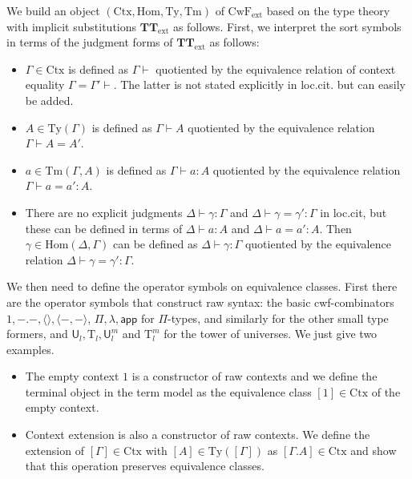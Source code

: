 \documentclass[11pt,a4paper]{article}
\theoremstyle{plain}
\theoremstyle{definition}
\newcommand{\app}[2]{{#1\,#2}} %
\newcommand{\Ctx}{\mathrm{Ctx}}
\newcommand{\Sub}{\mathrm{Hom}}
\newcommand{\Ty}{\mathrm{Ty}}
\newcommand{\Tm}{\mathrm{Tm}}
\newcommand{\tuple}[1]{\langle #1 \rangle}
\def\app{\mathsf{app}}
\def\U{\mathsf{U}}
\newcommand{\Ta}{\mathrm{T}}
\def\CwFext{\mathrm{CwF_{ext}}}
\def\TText{{\mathbf{TT}_\mathrm{ext}}}
\begin{document}
We build an object $(\Ctx,\Sub,\Ty,\Tm)$ of $\CwFext$ based on the type theory with implicit substitutions $\TText$ as follows. First, we interpret the sort symbols in terms of the judgment forms of $\TText$ as follows:
\begin{itemize}
\item $\Gamma \in \Ctx$ is defined as $\Gamma \vdash$ quotiented by the equivalence relation of context equality $\Gamma = \Gamma' \vdash$. The latter is not stated explicitly in loc.cit. but can easily be added.
\item $A \in \Ty(\Gamma)$ is defined as $\Gamma \vdash A$ quotiented by the equivalence relation $\Gamma \vdash A = A'$.
\item $a \in \Tm(\Gamma,A)$ is defined as $\Gamma \vdash a : A$ quotiented by the equivalence relation $\Gamma \vdash a = a' : A$.
\item There are no explicit judgments $\Delta \vdash \gamma : \Gamma$ and $\Delta \vdash \gamma = \gamma' : \Gamma$  in loc.cit, but these can be defined in terms of $\Delta \vdash a : A$ and $\Delta \vdash a = a' : A$. Then $\gamma \in \Sub(\Delta,\Gamma)$ can be defined as $\Delta \vdash \gamma : \Gamma$ quotiented by the equivalence relation $\Delta \vdash  \gamma = \gamma' : \Gamma$.
\end{itemize}
We then need to define the operator symbols on equivalence classes. First there are the operator symbols that construct raw syntax: the basic cwf-combinators $1, -.-, \tuple{}, \tuple{-,-}$,  $\Pi, \lambda, \app$ for $\Pi$-types, and similarly for the other small type formers, and $\U_l, \Ta_l, \U^m_l$ and $\Ta^m_l$ for the tower of universes. We just give two examples.
\begin{itemize}
\item The empty context $1$ is a constructor of raw contexts and we define the terminal object in the term model as the equivalence class $[1] \in \Ctx$ of the empty context.
\item Context extension is also a constructor of raw contexts. We define the extension of $[\Gamma] \in \Ctx$ with $[A] \in \Ty([\Gamma])$ as $[\Gamma.A] \in \Ctx$ and show that this operation preserves equivalence classes.
\end{itemize}
\end{document}
